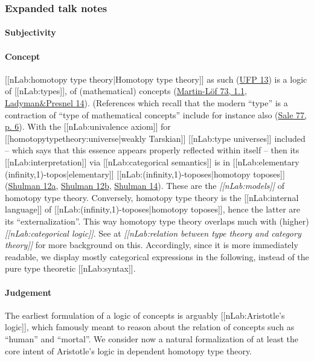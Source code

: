 \documentclass[12pt,titlepage]{article}
\theoremstyle{plain}
\theoremstyle{definition}
\theoremstyle{remark}
\begin{document}
\hypertarget{expanded_talk_notes}{}\subsubsection*{{Expanded talk notes}}\label{expanded_talk_notes}
\hypertarget{FormalizationConcepts}{}\paragraph*{{Subjectivity}}\label{FormalizationConcepts}
\hypertarget{ConceptFormalization}{}\paragraph*{{Concept}}\label{ConceptFormalization}
[[nLab:homotopy type theory|Homotopy type theory]] as such (\hyperlink{UFP13}{UFP 13}) is a logic of [[nLab:types]], of (mathematical) concepts (\hyperlink{MartinLoef73}{Martin-Löf 73, 1.1}, \hyperlink{LadymanPresnel14}{Ladyman\&Presnel 14}). (References which recall that the modern ``type'' is a contraction of ``type of mathematical concepts'' include for instance also (\hyperlink{Sale77}{Sale 77, p. 6}).
With the [[nLab:univalence axiom]] for [[homotopytypetheory:universe|weakly Tarskian]] [[nLab:type universes]] included -- which says that this essence appears properly reflected within itself -- then its [[nLab:interpretation]] via [[nLab:categorical semantics]] is in [[nLab:elementary (infinity,1)-topos|elementary]] [[nLab:(infinity,1)-toposes|homotopy toposes]] (\hyperlink{Shulman12a}{Shulman 12a}, \hyperlink{Shulman12b}{Shulman 12b}, \hyperlink{Shulman14}{Shulman 14}). These are the \emph{[[nLab:models]]} of homotopy type theory. Conversely, homotopy type theory is the [[nLab:internal language]] of [[nLab:(infinity,1)-toposes|homotopy toposes]], hence the latter are its ``externalization''. This way homotopy type theory overlaps much with (higher) \emph{[[nLab:categorical logic]]}. See at \emph{[[nLab:relation between type theory and category theory]]} for more background on this.
Accordingly, since it is more immediately readable, we display mostly categorical expressions in the following, instead of the pure type theoretic [[nLab:syntax]].
\hypertarget{JudgementInFormalization}{}\paragraph*{{Judgement}}\label{JudgementInFormalization}
The earliest formulation of a logic of concepts is arguably [[nLab:Aristotle's logic]], which famously meant to reason about the relation of concepts such as ``human'' and ``mortal''. We consider now a natural formalization of at least the core intent of Aristotle's logic in dependent homotopy type theory.
\end{document}
